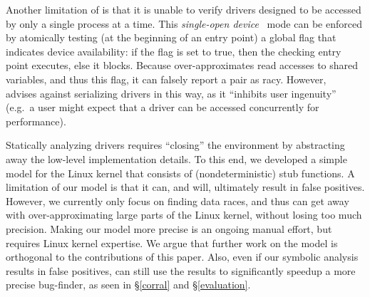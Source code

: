 Another limitation of \whoop is that it is unable to verify drivers designed to be accessed by only a single process at a time. This \emph{single-open device}~\cite[p.\ 173]{corbet2005linux} mode can be enforced by atomically testing (at the beginning of an entry point) a global flag that indicates device availability: if the flag is set to true, then the checking entry point executes, else it blocks. Because \whoop over-approximates read accesses to shared variables, and thus this flag, it can falsely report a pair as racy. However,~\cite[p.\ 173]{corbet2005linux} advises against serializing drivers in this way, as it ``inhibits user ingenuity'' (e.g.\ a user might expect that a driver can be accessed concurrently for performance).

Statically analyzing drivers requires ``closing'' the environment by abstracting away the low-level implementation details. To this end, we developed a simple model for the Linux kernel that consists of (nondeterministic) stub functions. A limitation of our model is that it can, and will, ultimately result in false positives. However, we currently only focus on finding data races, and thus can get away with over-approximating large parts of the Linux kernel, without losing too much precision. Making our model more precise is an ongoing manual effort, but requires Linux kernel expertise. We argue that further work on the model is orthogonal to the contributions of this paper. Also, even if our symbolic analysis results in false positives, \whoop can still use the results to significantly speedup a more precise bug-finder, as seen in \S\ref{corral} and \S\ref{evaluation}.

